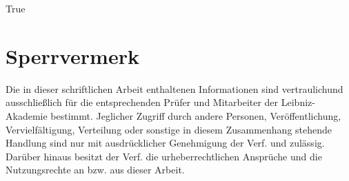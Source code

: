 \documentclass[a4paper, 11pt ]{article}
\def\True{True}
\begin{document}





\newpage
\tableofcontents


%

\if \Sperrvermerk  \True
 \section*{Sperrvermerk}
 Die in dieser schriftlichen Arbeit enthaltenen Informationen sind vertraulichund ausschließlich
 für die entsprechenden Prüfer und Mitarbeiter der Leibniz-Akademie bestimmt.
Jeglicher Zugriff durch andere Personen, Veröffentlichung, Vervielfältigung,
Verteilung oder sonstige in diesem Zusammenhang stehende Handlung sind nur mit ausdrücklicher
Genehmigung der Verf. und \Firma\space zulässig. Darüber hinaus besitzt der
Verf. die urheberrecht\-lichen Ansprüche und \Firma\space die Nutzungsrechte
an bzw. aus dieser Arbeit.
\fi







\end{document}
